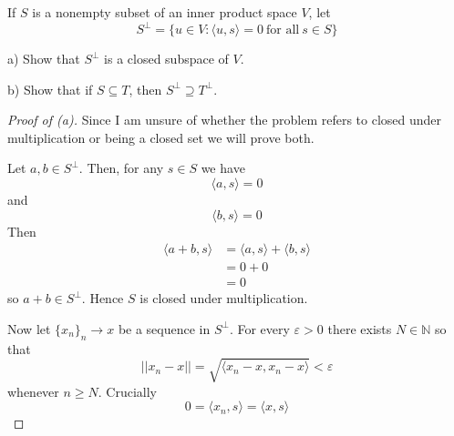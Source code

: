\begin{prob}
    If $S$ is a nonempty subset of an inner product space 
    $V$, let 
    \[
        S^{\bot} = \{u \in V : \langle u,s\rangle = 0 \ 
        \text{for all} \ s \in S\}
    \]

    a) Show that $S^\bot$ is a closed subspace of $V$. 

    b) Show that if $S \subseteq T$, then $S^\bot \supseteq T^\bot$.
\end{prob}
\begin{proof}[Proof of (a)]
    Since I am unsure of whether the problem refers to 
    closed under multiplication or being a closed set we will 
    prove both.

    Let $a,b \in S^\bot$. Then, for any $s \in S$ we have 
    \[
        \langle a, s\rangle = 0
    \]
    and 
    \[
        \langle b,s \rangle = 0
    \]
    Then 
    \begin{align*}
        \langle a+b, s\rangle &= \langle a,s\rangle + 
        \langle b,s\rangle \\ 
                              &= 0 + 0 \\ 
                              &= 0
    \end{align*}
    so $a+b \in S^\bot$. Hence $S$ is closed under multiplication. 

    Now let $\{x_n\}_n \to x$ be a sequence in $S^\bot$. 
    For every $\varepsilon > 0$ there exists $N \in \mathbb N$ 
    so that 
    \[
        ||x_n - x|| = \sqrt{\langle x_n - x, x_n - x\rangle} < 
        \varepsilon
    \]
    whenever $n \geq N$. Crucially 
    \[
        0 = \langle x_n, s\rangle = \langle x, s\rangle
    \] 
\end{proof}

